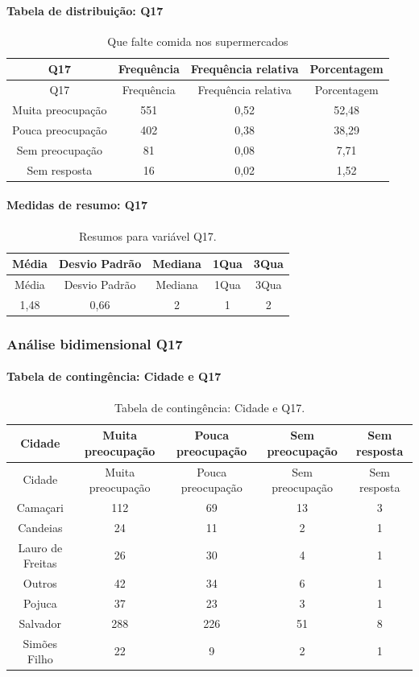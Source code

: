 \documentclass[]{article}
\let\oldparagraph\paragraph
\renewcommand{\paragraph}[1]{\oldparagraph{#1}\mbox{}}
\begin{document}
\hypertarget{tabela-de-distribuiuxe7uxe3o-q17}{%
\paragraph{Tabela de distribuição: Q17}\label{tabela-de-distribuiuxe7uxe3o-q17}}

\begin{longtable}[]{@{}cccc@{}}
\caption{\label{tab:unnamed-chunk-179}Que falte comida nos supermercados}\tabularnewline
\toprule
Q17 & Frequência & Frequência relativa & Porcentagem\tabularnewline
\midrule
\endfirsthead
\toprule
Q17 & Frequência & Frequência relativa & Porcentagem\tabularnewline
\midrule
\endhead
Muita preocupação & 551 & 0,52 & 52,48\tabularnewline
Pouca preocupação & 402 & 0,38 & 38,29\tabularnewline
Sem preocupação & 81 & 0,08 & 7,71\tabularnewline
Sem resposta & 16 & 0,02 & 1,52\tabularnewline
\bottomrule
\end{longtable}

\hypertarget{medidas-de-resumo-q17}{%
\paragraph{Medidas de resumo: Q17}\label{medidas-de-resumo-q17}}

\begin{longtable}[]{@{}ccccc@{}}
\caption{\label{tab:unnamed-chunk-180}Resumos para variável Q17.}\tabularnewline
\toprule
Média & Desvio Padrão & Mediana & 1Qua & 3Qua\tabularnewline
\midrule
\endfirsthead
\toprule
Média & Desvio Padrão & Mediana & 1Qua & 3Qua\tabularnewline
\midrule
\endhead
1,48 & 0,66 & 2 & 1 & 2\tabularnewline
\bottomrule
\end{longtable}

\cleardoublepage

\hypertarget{anuxe1lise-bidimensional-q17}{%
\subsubsection{Análise bidimensional Q17}\label{anuxe1lise-bidimensional-q17}}

\hypertarget{tabela-de-continguxeancia-cidade-e-q17}{%
\paragraph{Tabela de contingência: Cidade e Q17}\label{tabela-de-continguxeancia-cidade-e-q17}}

\begin{longtable}[]{@{}ccccc@{}}
\caption{\label{tab:unnamed-chunk-181}Tabela de contingência: Cidade e Q17.}\tabularnewline
\toprule
Cidade & Muita preocupação & Pouca preocupação & Sem preocupação & Sem resposta\tabularnewline
\midrule
\endfirsthead
\toprule
Cidade & Muita preocupação & Pouca preocupação & Sem preocupação & Sem resposta\tabularnewline
\midrule
\endhead
Camaçari & 112 & 69 & 13 & 3\tabularnewline
Candeias & 24 & 11 & 2 & 1\tabularnewline
Lauro de Freitas & 26 & 30 & 4 & 1\tabularnewline
Outros & 42 & 34 & 6 & 1\tabularnewline
Pojuca & 37 & 23 & 3 & 1\tabularnewline
Salvador & 288 & 226 & 51 & 8\tabularnewline
Simões Filho & 22 & 9 & 2 & 1\tabularnewline
\bottomrule
\end{longtable}
\end{document}
